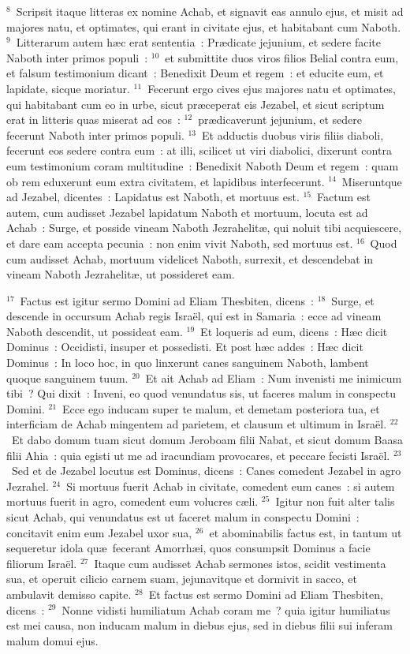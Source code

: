 ${}^{8}$~Scripsit itaque litteras ex nomine Achab, et signavit eas annulo ejus, et misit ad majores natu, et optimates, qui erant in civitate ejus, et habitabant cum Naboth.
${}^{9}$~Litterarum autem h\ae c erat sententia~: Pr\ae dicate jejunium, et sedere facite Naboth inter primos populi~:
${}^{10}$~et submittite duos viros filios Belial contra eum, et falsum testimonium dicant~: Benedixit Deum et regem~: et educite eum, et lapidate, sicque moriatur.
${}^{11}$~Fecerunt ergo cives ejus majores natu et optimates, qui habitabant cum eo in urbe, sicut pr\ae ceperat eis Jezabel, et sicut scriptum erat in litteris quas miserat ad eos~:
${}^{12}$~pr\ae dicaverunt jejunium, et sedere fecerunt Naboth inter primos populi.
${}^{13}$~Et adductis duobus viris filiis diaboli, fecerunt eos sedere contra eum~: at illi, scilicet ut viri diabolici, dixerunt contra eum testimonium coram multitudine~: Benedixit Naboth Deum et regem~: quam ob rem eduxerunt eum extra civitatem, et lapidibus interfecerunt.
${}^{14}$~Miseruntque ad Jezabel, dicentes~: Lapidatus est Naboth, et mortuus est.
${}^{15}$~Factum est autem, cum audisset Jezabel lapidatum Naboth et mortuum, locuta est ad Achab~: Surge, et posside vineam Naboth Jezrahelit\ae , qui noluit tibi acquiescere, et dare eam accepta pecunia~: non enim vivit Naboth, sed mortuus est.
${}^{16}$~Quod cum audisset Achab, mortuum videlicet Naboth, surrexit, et descendebat in vineam Naboth Jezrahelit\ae , ut possideret eam.


${}^{17}$~Factus est igitur sermo Domini ad Eliam Thesbiten, dicens~:
${}^{18}$~Surge, et descende in occursum Achab regis Isra\"el, qui est in Samaria~: ecce ad vineam Naboth descendit, ut possideat eam.
${}^{19}$~Et loqueris ad eum, dicens~: H\ae c dicit Dominus~: Occidisti, insuper et possedisti. Et post h\ae c addes~: H\ae c dicit Dominus~: In loco hoc, in quo linxerunt canes sanguinem Naboth, lambent quoque sanguinem tuum.
${}^{20}$~Et ait Achab ad Eliam~: Num invenisti me inimicum tibi~? Qui dixit~: Inveni, eo quod venundatus sis, ut faceres malum in conspectu Domini.
${}^{21}$~Ecce ego inducam super te malum, et demetam posteriora tua, et interficiam de Achab mingentem ad parietem, et clausum et ultimum in Isra\"el.
${}^{22}$~Et dabo domum tuam sicut domum Jeroboam filii Nabat, et sicut domum Baasa filii Ahia~: quia egisti ut me ad iracundiam provocares, et peccare fecisti Isra\"el.
${}^{23}$~Sed et de Jezabel locutus est Dominus, dicens~: Canes comedent Jezabel in agro Jezrahel.
${}^{24}$~Si mortuus fuerit Achab in civitate, comedent eum canes~: si autem mortuus fuerit in agro, comedent eum volucres c\ae li.
${}^{25}$~Igitur non fuit alter talis sicut Achab, qui venundatus est ut faceret malum in conspectu Domini~: concitavit enim eum Jezabel uxor sua,
${}^{26}$~et abominabilis factus est, in tantum ut sequeretur idola qu\ae\ fecerant Amorrh\ae i, quos consumpsit Dominus a facie filiorum Isra\"el.
${}^{27}$~Itaque cum audisset Achab sermones istos, scidit vestimenta sua, et operuit cilicio carnem suam, jejunavitque et dormivit in sacco, et ambulavit demisso capite.
${}^{28}$~Et factus est sermo Domini ad Eliam Thesbiten, dicens~:
${}^{29}$~Nonne vidisti humiliatum Achab coram me~? quia igitur humiliatus est mei causa, non inducam malum in diebus ejus, sed in diebus filii sui inferam malum domui ejus.

